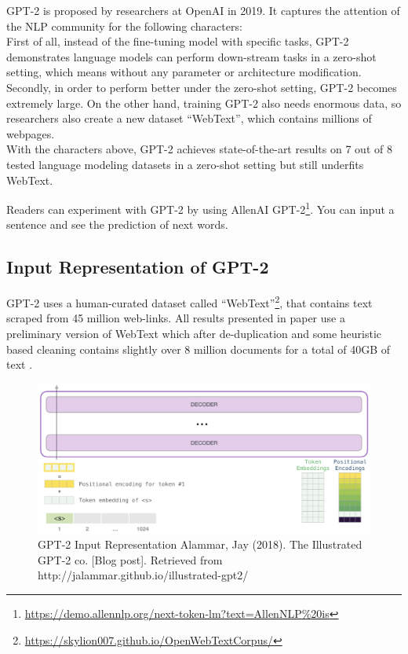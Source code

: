 \documentclass[]{krantz}
\renewcommand{\href}[2]{#2\footnote{\url{#1}}}
\begin{document}
GPT-2 is proposed by researchers at OpenAI in 2019. It captures the attention of the NLP community for the following characters:\\
First of all, instead of the fine-tuning model with specific tasks, GPT-2 demonstrates language models can perform down-stream tasks in a zero-shot setting, which means without any parameter or architecture modification. Secondly, in order to perform better under the zero-shot setting, GPT-2 becomes extremely large. On the other hand, training GPT-2 also needs enormous data, so researchers also create a new dataset ``WebText'', which contains millions of webpages.\\
With the characters above, GPT-2 achieves state-of-the-art results on 7 out of 8 tested language modeling datasets in a zero-shot setting but still underfits WebText.

Readers can experiment with GPT-2 by using \href{https://demo.allennlp.org/next-token-lm?text=AllenNLP\%20is}{AllenAI GPT-2}. You can input a sentence and see the prediction of next words.

\hypertarget{input-representation-of-gpt-2}{%
\subsection{Input Representation of GPT-2}\label{input-representation-of-gpt-2}}

GPT-2 uses a human-curated dataset called \href{https://skylion007.github.io/OpenWebTextCorpus/}{``WebText''}, that contains text scraped from 45 million web-links. All results presented in paper use a preliminary version of WebText which after de-duplication and some heuristic based cleaning contains slightly over 8 million documents for a total of 40GB of text \citet{radford2019gpt2}.

\begin{figure}

{\centering \includegraphics[width=0.7\linewidth]{figures/02-03-transfer-learning-for-nlp/gpt_input_representation} 

}

\caption{GPT-2 Input Representation  
 Alammar, Jay (2018). The Illustrated GPT-2 co. [Blog post]. Retrieved from http://jalammar.github.io/illustrated-gpt2/}\label{fig:ch02-03-figure07}
\end{figure}
\end{document}
